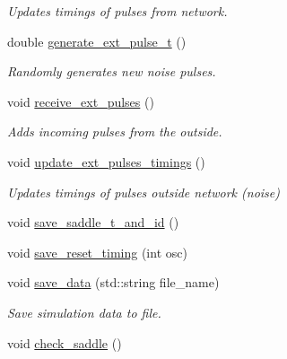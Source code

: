 \begin{DoxyCompactItemize}
\begin{DoxyCompactList}\small\item\em Updates timings of pulses from network. \end{DoxyCompactList}\item 
\hypertarget{classLifNetSim_a4ce036135cee1e508dee8856d9583ec6}{double \hyperlink{classLifNetSim_a4ce036135cee1e508dee8856d9583ec6}{generate\-\_\-ext\-\_\-pulse\-\_\-t} ()}\label{classLifNetSim_a4ce036135cee1e508dee8856d9583ec6}

\begin{DoxyCompactList}\small\item\em Randomly generates new noise pulses. \end{DoxyCompactList}\item 
\hypertarget{classLifNetSim_a76acb81ebca24fa243d745eba42018f0}{void \hyperlink{classLifNetSim_a76acb81ebca24fa243d745eba42018f0}{receive\-\_\-ext\-\_\-pulses} ()}\label{classLifNetSim_a76acb81ebca24fa243d745eba42018f0}

\begin{DoxyCompactList}\small\item\em Adds incoming pulses from the outside. \end{DoxyCompactList}\item 
\hypertarget{classLifNetSim_aea0ef0f42f7b2812dc870a19ce55f3b9}{void \hyperlink{classLifNetSim_aea0ef0f42f7b2812dc870a19ce55f3b9}{update\-\_\-ext\-\_\-pulses\-\_\-timings} ()}\label{classLifNetSim_aea0ef0f42f7b2812dc870a19ce55f3b9}

\begin{DoxyCompactList}\small\item\em Updates timings of pulses outside network (noise) \end{DoxyCompactList}\item 
void \hyperlink{classLifNetSim_ace0373bc7bd9c4ce2ecb9c8464a32eb6}{save\-\_\-saddle\-\_\-t\-\_\-and\-\_\-id} ()
\item 
void \hyperlink{classLifNetSim_a53ec98926ef6138230f0e2f5cecba444}{save\-\_\-reset\-\_\-timing} (int osc)
\item 
\hypertarget{classLifNetSim_ad904082e4da0319cc30428b7e5f48a99}{void \hyperlink{classLifNetSim_ad904082e4da0319cc30428b7e5f48a99}{save\-\_\-data} (std\-::string file\-\_\-name)}\label{classLifNetSim_ad904082e4da0319cc30428b7e5f48a99}

\begin{DoxyCompactList}\small\item\em Save simulation data to file. \end{DoxyCompactList}\item 
\hypertarget{classLifNetSim_a1e8bbb31039d847ae29dbdc248cc0b10}{void \hyperlink{classLifNetSim_a1e8bbb31039d847ae29dbdc248cc0b10}{check\-\_\-saddle} ()}\label{classLifNetSim_a1e8bbb31039d847ae29dbdc248cc0b10}


\end{DoxyCompactItemize}
